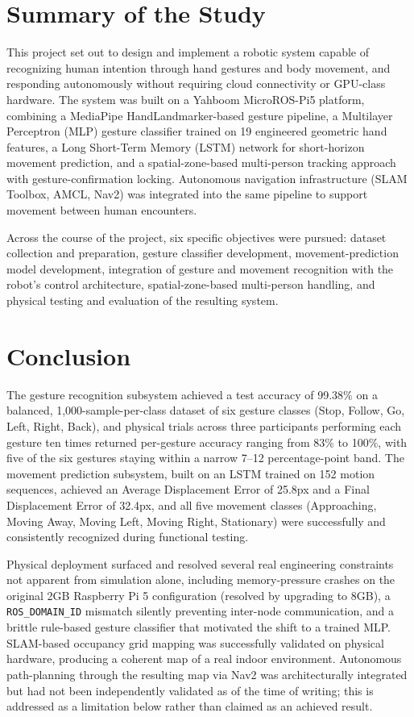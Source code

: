 \section{Summary of the Study}

This project set out to design and implement a robotic system capable of recognizing
human intention through hand gestures and body movement, and responding autonomously
without requiring cloud connectivity or GPU-class hardware. The system was built on a
Yahboom MicroROS-Pi5 platform, combining a MediaPipe HandLandmarker-based gesture
pipeline, a Multilayer Perceptron (MLP) gesture classifier trained on 19 engineered
geometric hand features, a Long Short-Term Memory (LSTM) network for short-horizon
movement prediction, and a spatial-zone-based multi-person tracking approach with
gesture-confirmation locking. Autonomous navigation infrastructure (SLAM Toolbox,
AMCL, Nav2) was integrated into the same pipeline to support movement between human
encounters.

Across the course of the project, six specific objectives were pursued: dataset
collection and preparation, gesture classifier development, movement-prediction model
development, integration of gesture and movement recognition with the robot's control
architecture, spatial-zone-based multi-person handling, and physical testing and
evaluation of the resulting system.

\section{Conclusion}

The gesture recognition subsystem achieved a test accuracy of 99.38\% on a balanced,
1,000-sample-per-class dataset of six gesture classes (Stop, Follow, Go, Left, Right,
Back), and physical trials across three participants performing each gesture ten times
returned per-gesture accuracy ranging from 83\% to 100\%, with five of the six gestures
staying within a narrow 7--12 percentage-point band. The movement prediction subsystem,
built on an LSTM trained on 152 motion sequences, achieved an Average Displacement
Error of 25.8px and a Final Displacement Error of 32.4px, and all five movement
classes (Approaching, Moving Away, Moving Left, Moving Right, Stationary) were
successfully and consistently recognized during functional testing.

Physical deployment surfaced and resolved several real engineering constraints not
apparent from simulation alone, including memory-pressure crashes on the original 2GB
Raspberry Pi 5 configuration (resolved by upgrading to 8GB), a \texttt{ROS\_DOMAIN\_ID}
mismatch silently preventing inter-node communication, and a brittle rule-based
gesture classifier that motivated the shift to a trained MLP. SLAM-based occupancy
grid mapping was successfully validated on physical hardware, producing a coherent map
of a real indoor environment. Autonomous path-planning through the resulting map via
Nav2 was architecturally integrated but had not been independently validated as of the
time of writing; this is addressed as a limitation below rather than claimed as an
achieved result.

